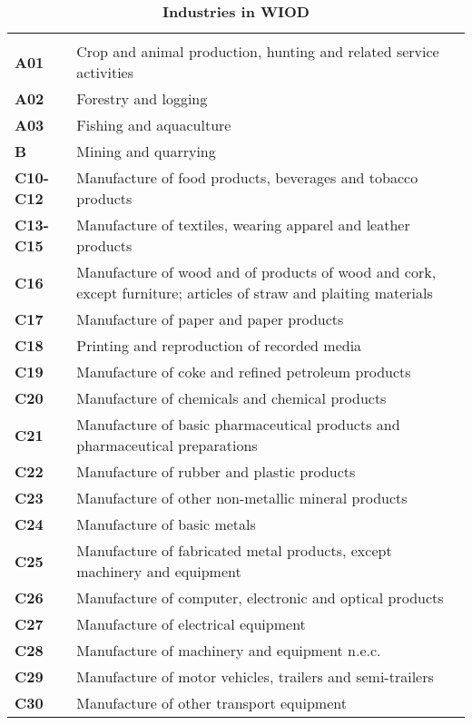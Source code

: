 \documentclass[11pt,a4paper]{article}
\begin{document}
\newpage

\newpage
{}
\begin{table}[!h]
 \centering
 \caption{\footnotesize{\textbf{Industries in WIOD}}}
 \footnotesize
 \begin{tabular}{ll}
  \hline \\
\textbf{A01} &{Crop and animal production, hunting and related service activities}\\
\textbf{A02} &{Forestry and logging}\\
\textbf{A03} &{Fishing and aquaculture}\\
\textbf{B} &{Mining and quarrying}\\
\textbf{C10-C12} &{Manufacture of food products, beverages and tobacco products}\\
\textbf{C13-C15} &{Manufacture of textiles, wearing apparel and leather products}\\
\textbf{C16} &{Manufacture of wood and of products of wood and cork, except furniture; articles of straw and plaiting materials}\\
\textbf{C17} &{Manufacture of paper and paper products}\\
\textbf{C18} &{Printing and reproduction of recorded media}\\
\textbf{C19} &{Manufacture of coke and refined petroleum products}\\
\textbf{C20} &{Manufacture of chemicals and chemical products}\\
\textbf{C21} &{Manufacture of basic pharmaceutical products and pharmaceutical preparations}\\
\textbf{C22} &{Manufacture of rubber and plastic products}\\
\textbf{C23} &{Manufacture of other non-metallic mineral products}\\
\textbf{C24} &{Manufacture of basic metals}\\
\textbf{C25} &{Manufacture of fabricated metal products, except machinery and equipment}\\
\textbf{C26} &{Manufacture of computer, electronic and optical products}\\
\textbf{C27} &{Manufacture of electrical equipment}\\
\textbf{C28} &{Manufacture of machinery and equipment n.e.c.}\\
\textbf{C29} &{Manufacture of motor vehicles, trailers and semi-trailers}\\
\textbf{C30} &{Manufacture of other transport equipment}\\

\end{tabular}
\end{table}
\end{document}
